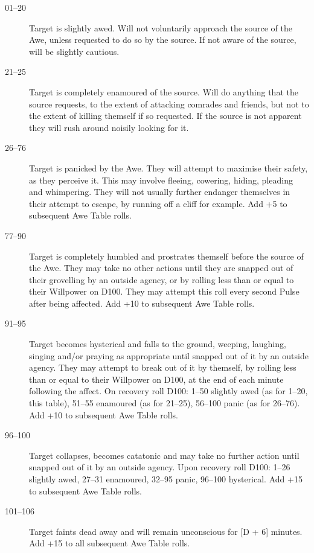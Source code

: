 \begin{multicols}{2}
\begin{description}

\item[01--20] Target is slightly awed.  Will not voluntarily approach
the source of the Awe, unless requested to do so by the source. If not
aware of the source, will be slightly cautious.

\item[21--25] Target is completely enamoured of the source.  Will do
anything that the source requests, to the extent of attacking comrades
and friends, but not to the extent of killing themself if so
requested.  If the source is not apparent they will rush around
noisily looking for it.

\item[26--76] Target is panicked by the Awe.  They will attempt to
maximise their safety, as they perceive it.  This may involve fleeing,
cowering, hiding, pleading and whimpering.  They will not usually
further endanger themselves in their attempt to escape, by running off
a cliff for example.  Add +5 to subsequent Awe Table rolls.

\item[77--90] Target is completely humbled and prostrates themself
before the source of the Awe.  They may take no other actions until
they are snapped out of their grovelling by an outside agency, or by
rolling less than or equal to their Willpower on D100.  They may
attempt this roll every second Pulse after being affected.  Add +10 to
subsequent Awe Table rolls.

\item[91--95] Target becomes hysterical and falls to the ground,
weeping, laughing, singing and/or praying as appropriate until snapped
out of it by an outside agency.  They may attempt to break out of it
by themself, by rolling less than or equal to their Willpower on D100,
at the end of each minute following the affect.  On recovery roll
D100: 1--50 slightly awed (as for 1--20, this table), 51--55 enamoured
(as for 21--25), 56--100 panic (as for 26--76).  Add +10 to subsequent
Awe Table rolls.

\item[96--100] Target collapses, becomes catatonic and may take no
further action until snapped out of it by an outside agency.  Upon
recovery roll D100: 1--26 slightly awed, 27--31 enamoured, 32--95 panic,
96--100 hysterical.  Add +15 to subsequent Awe Table rolls.

\item[101--106] Target faints dead away and will remain unconscious
for [D + 6] minutes.  Add +15 to all subsequent Awe Table rolls.


\end{description}
\end{multicols}

